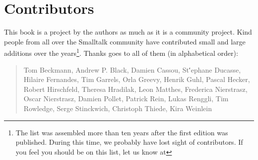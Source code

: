 \chapter*{Contributors}
This book is a project by the authors as much as it is a community project. Kind people from all over the Smalltalk community have contributed small and large additions over the years\footnote{The list was assembled more than ten years after the first edition was published. During this time, we probably have lost sight of contributors. If you feel you should be on this list, let us know at \sbeRepoUrl}. Thanks goes to all of them (in alphabetical order):


\begin{quotation}
Tom Beckmann, Andrew P. Black, Damien Cassou, St\''ephane Ducasse, Hilaire Fernandes, Tim Garrels, Orla Greevy, Henrik Guhl, Pascal Hecker, Robert Hirschfeld, Theresa Hradilak, Leon Matthes, Frederica Nierstrasz, Oscar Nierstrasz, Damien Pollet, Patrick Rein, Lukas Renggli, Tim Rowledge, Serge Stinckwich, Christoph Thiede, Kira Weinlein
\end{quotation}

%
%
%
